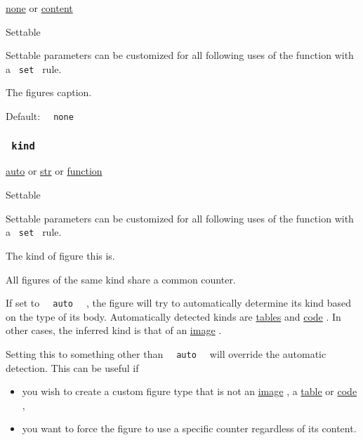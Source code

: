 \href{/docs/reference/foundations/none/}{none} {or}
\href{/docs/reference/foundations/content/}{content}

{{ Settable }}

\label{parameters-caption-settable-tooltip}
Settable parameters can be customized for all following uses of the
function with a \texttt{\ set\ } rule.

The figure\textquotesingle s caption.

Default: \texttt{\ }{\texttt{\ none\ }}\texttt{\ }

\subsubsection{\texorpdfstring{\texttt{\ kind\ }}{ kind }}\label{parameters-kind}

\href{/docs/reference/foundations/auto/}{auto} {or}
\href{/docs/reference/foundations/str/}{str} {or}
\href{/docs/reference/foundations/function/}{function}

{{ Settable }}

\label{parameters-kind-settable-tooltip}
Settable parameters can be customized for all following uses of the
function with a \texttt{\ set\ } rule.

The kind of figure this is.

All figures of the same kind share a common counter.

If set to \texttt{\ }{\texttt{\ auto\ }}\texttt{\ } , the figure will
try to automatically determine its kind based on the type of its body.
Automatically detected kinds are
\href{/docs/reference/model/table/}{tables} and
\href{/docs/reference/text/raw/}{code} . In other cases, the inferred
kind is that of an \href{/docs/reference/visualize/image/}{image} .

Setting this to something other than
\texttt{\ }{\texttt{\ auto\ }}\texttt{\ } will override the automatic
detection. This can be useful if

\begin{itemize}
\tightlist
\item
  you wish to create a custom figure type that is not an
  \href{/docs/reference/visualize/image/}{image} , a
  \href{/docs/reference/model/table/}{table} or
  \href{/docs/reference/text/raw/}{code} ,
\item
  you want to force the figure to use a specific counter regardless of
  its content.
\end{itemize}

